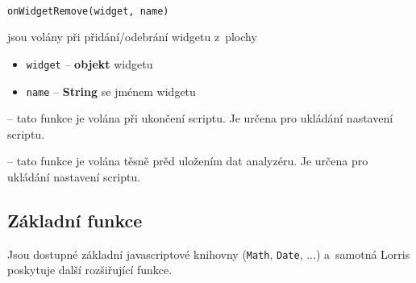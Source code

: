 \documentclass[12pt, a4paper, oneside]{article}
\begin{document}
 \\
{\color{blue}\verb/onWidgetRemove(widget, name)/}

jsou volány při přidání/odebrání widgetu z~plochy
\begin{itemize}
    \item \verb/widget/ -- {\bf objekt} widgetu
    \item \verb/name/ -- {\bf String} se jménem widgetu
\end{itemize}

 -- tato funkce je volána při ukončení scriptu. Je určena pro ukládání nastavení scriptu.

 -- tato funkce je volána těsně prěd uložením dat analyzéru. Je určena pro ukládání nastavení scriptu.

\subsection*{Základní funkce}
Jsou dostupné základní javascriptové knihovny (\verb/Math/, \verb/Date/, ...) a~samotná Lorris poskytuje další rozšiřující funkce. 
\end{document}
